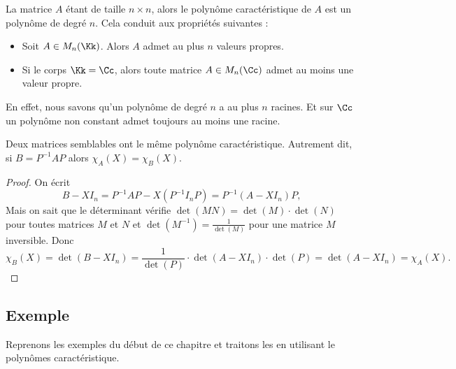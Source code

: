 \documentclass[11pt, class=report,crop=false]{standalone}
\begin{document}
\medskip


La matrice $A$ étant de taille $n \times n$, alors le polynôme 
caractéristique de $A$ est un polynôme de degré $n$. Cela conduit aux propriétés suivantes :
\begin{corollaire}
\sauteligne
\begin{itemize}
  \item Soit $A \in M_n(\Kk)$. Alors $A$ admet au plus $n$ valeurs propres.
  
  \item Si le corps $\Kk=\Cc$, alors toute matrice $A \in M_n(\Cc)$ admet 
au moins une valeur propre.
\end{itemize}
\end{corollaire}
 
En effet, nous savons qu'un polynôme de degré $n$ a au plus $n$ racines. Et sur $\Cc$ un polynôme non constant admet toujours au moins une racine.


\begin{proposition}
Deux matrices semblables ont le même polynôme caractéristique.
Autrement dit, si $B = P^{-1}AP$ alors $\chi_A(X) = \chi_B(X)$.
\end{proposition}


\begin{proof}
On écrit 
$$B-XI_n=P^{-1}AP-X(P^{-1}I_nP)=P^{-1}(A-XI_n)P,$$
Mais on sait que le déterminant vérifie $\det(MN) = \det(M)\cdot\det(N)$ pour toutes matrices $M$ et $N$
et $\det(M^{-1}) = \frac{1}{\det(M)}$ pour une matrice $M$ inversible.
Donc
$$\chi_B(X) 
= \det(B-XI_n)
= \frac{1}{\det(P)} \cdot \det(A-XI_n) \cdot \det(P)
= \det(A-XI_n) 
= \chi_A(X).$$
\end{proof}

\subsection{Exemple}

Reprenons les exemples du début de ce chapitre et traitons les en utilisant le polynômes caractéristique.
\end{document}
